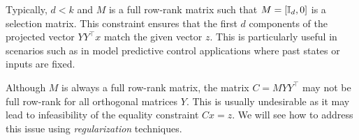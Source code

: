 \begin{Note}
    Typically, $d < k$ and $M$ is a full row-rank matrix such that $M = [\mathbb{I}_d, 0]$ is a selection matrix. This constraint ensures that the first $d$ components of the projected vector $YY^\top x$ match the given vector $z$. This is particularly useful in scenarios such as in model predictive control applications where past states or inputs are fixed.
\end{Note}
\begin{remark}
    Although $M$ is always a full row-rank matrix, the matrix $C = MYY^\top$ may not be full row-rank for all orthogonal matrices $Y$. This is usually undesirable as it may lead to infeasibility of the equality constraint $Cx = z$. We will see how to address this issue using \emph{regularization} techniques. 
\end{remark}

